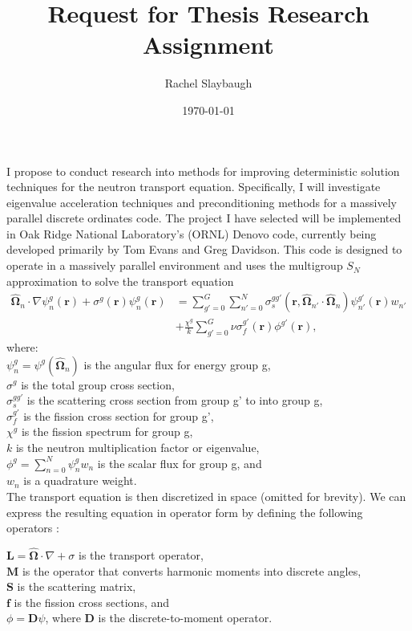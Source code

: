\documentclass[12pt, letterpaper]{article}
\date{\today}
\title{Request for Thesis Research Assignment}
\author{Rachel Slaybaugh}
\begin{document}
\maketitle

    I propose to conduct research into methods for improving deterministic solution techniques for the neutron transport equation. Specifically, I will investigate eigenvalue acceleration techniques and preconditioning methods for a massively parallel discrete ordinates code. The project I have selected will be implemented in Oak Ridge National Laboratory's (ORNL) Denovo code, currently being developed primarily by Tom Evans and Greg Davidson. This code is designed to operate in a massively parallel environment and uses the multigroup $S_{N}$ approximation to solve the transport equation \cite{Den}
\begin{align}
   \mathbf{\hat{\Omega}}_{n} \cdot \nabla \psi^{g}_{n}(\mathbf{r}) + \sigma^{g} (\mathbf{r}) \psi^{g}_{n}(\mathbf{r}) &= \sum_{g'=0}^{G}  \sum_{n'=0}^{N} \sigma_{s}^{gg'}(\mathbf{r}, \mathbf{\hat{\Omega}}_{n'} \cdot \mathbf{\hat{\Omega}}_{n}) \psi^{g'}_{n'}(\mathbf{r}) w_{n'} \nonumber \\
&+ \frac{\chi^{g}}{k} \sum_{g'=0}^{G} \nu \sigma_{f}^{g'}(\mathbf{r})\phi^{g'}(\mathbf{r}),
\end{align}
where: \\
\indent $\psi^{g}_{n} = \psi^{g}(\mathbf{\hat{\Omega}}_{n})$ is the angular flux for energy group g, \\
\indent $\sigma^{g}$ is the total group cross section, \\
\indent $\sigma^{gg'}_{s}$ is the scattering cross section from group g' to into group g, \\
\indent $\sigma^{g'}_{f}$ is the fission cross section for group g', \\
\indent $\chi^{g}$ is the fission spectrum for group g, \\
\indent $k$ is the neutron multiplication factor or eigenvalue, \\
\indent $\phi^{g} = \sum_{n=0}^{N} \psi^{g}_{n} w_{n}$ is the scalar flux for group g, and \\
\indent $w_{n}$ is a quadrature weight. \\

    The transport equation is then discretized in space (omitted for brevity). We can express the resulting equation in operator form by defining the following operators \cite{Den}:

\indent $\mathbf{L} = \mathbf{\hat{\Omega}} \cdot \nabla + \sigma$ is the transport operator, \\
\indent $\mathbf{M}$ is the operator that converts harmonic moments into discrete angles, \\
\indent $\mathbf{S}$ is the scattering matrix, \\
\indent $\mathbf{f}$ is the fission cross sections, and \\
\indent $\phi = \mathbf{D}\psi$, where $\mathbf{D}$ is the discrete-to-moment operator. 
\end{document}
